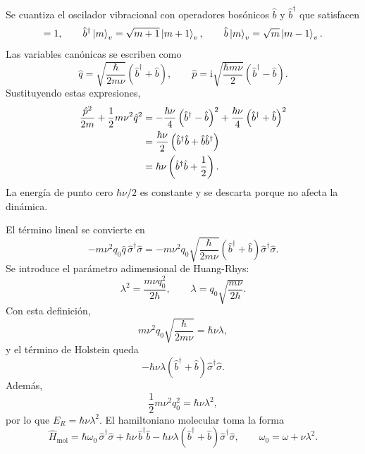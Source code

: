 \documentclass[11pt]{article}
\newcommand{\ii}{\mathrm{i}}
\newcommand{\bdag}{\hat b^\dagger}
\newcommand{\sigmad}{\hat\sigma^\dagger}
\begin{document}
Se cuantiza el oscilador vibracional con operadores bos\'onicos $\hat b$ y
$\bdag$ que satisfacen
\begin{equation}
  [\hat b,\bdag]=1,
  \qquad
  \bdag\ket{m}_v=\sqrt{m+1}\ket{m+1}_v,
  \qquad
  \hat b\ket{m}_v=\sqrt{m}\ket{m-1}_v .
\end{equation}
Las variables can\'onicas se escriben como
\begin{equation}
  \hat q=
  \sqrt{\frac{\hbar}{2m\nu}}\left(\bdag+\hat b\right),
  \qquad
  \hat p=
  \ii\sqrt{\frac{\hbar m\nu}{2}}\left(\bdag-\hat b\right).
\end{equation}
Sustituyendo estas expresiones,
\begin{align}
  \frac{\hat p^2}{2m}
  +
  \frac{1}{2}m\nu^2\hat q^2
  &=
  -\frac{\hbar\nu}{4}\left(\bdag-\hat b\right)^2
  +
  \frac{\hbar\nu}{4}\left(\bdag+\hat b\right)^2
  \notag\\
  &=
  \frac{\hbar\nu}{2}\left(\bdag\hat b+\hat b\bdag\right)
  \notag\\
  &=
  \hbar\nu\left(\bdag\hat b+\frac{1}{2}\right).
\end{align}
La energ\'ia de punto cero $\hbar\nu/2$ es constante y se descarta porque no
afecta la din\'amica.

El t\'ermino lineal se convierte en
\begin{equation}
  -m\nu^2q_0\hat q\,\sigmad\hat\sigma
  =
  -m\nu^2q_0
  \sqrt{\frac{\hbar}{2m\nu}}
  \left(\bdag+\hat b\right)\sigmad\hat\sigma .
\end{equation}
Se introduce el par\'ametro adimensional de Huang-Rhys:
\begin{equation}
  \boxed{
  \lambda^2=\frac{m\nu q_0^2}{2\hbar},
  \qquad
  \lambda=q_0\sqrt{\frac{m\nu}{2\hbar}}.
  }
\end{equation}
Con esta definici\'on,
\begin{equation}
  m\nu^2q_0\sqrt{\frac{\hbar}{2m\nu}}
  =
  \hbar\nu\lambda,
\end{equation}
y el t\'ermino de Holstein queda
\begin{equation}
  -\hbar\nu\lambda(\bdag+\hat b)\sigmad\hat\sigma .
\end{equation}
Adem\'as,
\begin{equation}
  \frac{1}{2}m\nu^2q_0^2=\hbar\nu\lambda^2,
\end{equation}
por lo que $E_R=\hbar\nu\lambda^2$. El hamiltoniano molecular toma la forma
\begin{equation}
  \boxed{
  \hat H_{\mathrm{mol}}
  =
  \hbar\omega_0\,\sigmad\hat\sigma
  +
  \hbar\nu\,\bdag\hat b
  -
  \hbar\nu\lambda(\bdag+\hat b)\sigmad\hat\sigma,
  \qquad
  \omega_0=\omega+\nu\lambda^2.
  }
\end{equation}
\end{document}
